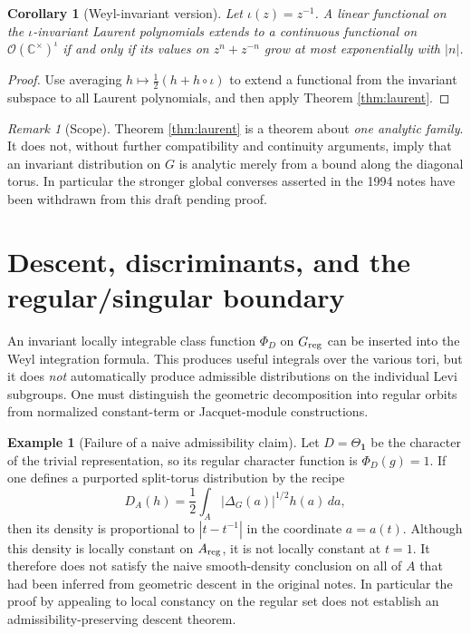 \documentclass[12pt,letterpaper]{amsart}
\numberwithin{equation}{section}
\newtheorem{corollary}[theorem]{Corollary}
\theoremstyle{definition}
\newtheorem{example}[theorem]{Example}
\theoremstyle{remark}
\newtheorem{remark}[theorem]{Remark}
\begin{document}
\begin{corollary}[Weyl-invariant version]
Let $\iota(z)=z^{-1}$. A linear functional on the $\iota$-invariant Laurent polynomials extends to a continuous functional on $\mathcal O(\mathbb C^\times)^\iota$ if and only if its values on $z^n+z^{-n}$ grow at most exponentially with $|n|$.
\end{corollary}
\begin{proof}
Use averaging $h\mapsto\tfrac12(h+h\circ\iota)$ to extend a functional from the invariant subspace to all Laurent polynomials, and then apply Theorem \ref{thm:laurent}.
\end{proof}

\begin{remark}[Scope]
Theorem \ref{thm:laurent} is a theorem about \emph{one analytic family}. It does not, without further compatibility and continuity arguments, imply that an invariant distribution on $G$ is analytic merely from a bound along the diagonal torus. In particular the stronger global converses asserted in the 1994 notes have been withdrawn from this draft pending proof.
\end{remark}

\section{Descent, discriminants, and the regular/singular boundary}\label{sec:descent}
An invariant locally integrable class function $\Phi_D$ on $G_{\rm reg}$ can be inserted into the Weyl integration formula. This produces useful integrals over the various tori, but it does \emph{not} automatically produce admissible distributions on the individual Levi subgroups. One must distinguish the geometric decomposition into regular orbits from normalized constant-term or Jacquet-module constructions.

\begin{example}[Failure of a naive admissibility claim]\label{ex:descent}
Let $D=\Theta_{\mathbf1}$ be the character of the trivial representation, so its regular character function is $\Phi_D(g)=1$. If one defines a purported split-torus distribution by the recipe
\[
D_A(h)=\frac12\int_A|\Delta_G(a)|^{1/2}h(a)\,da,
\]
then its density is proportional to $|t-t^{-1}|$ in the coordinate $a=a(t)$. Although this density is locally constant on $A_{\rm reg}$, it is not locally constant at $t=1$.  It therefore does not satisfy the naive smooth-density conclusion on all of $A$ that had been inferred from geometric descent in the original notes. In particular the proof by appealing to local constancy on the regular set does not establish an admissibility-preserving descent theorem.
\end{example}
\end{document}
